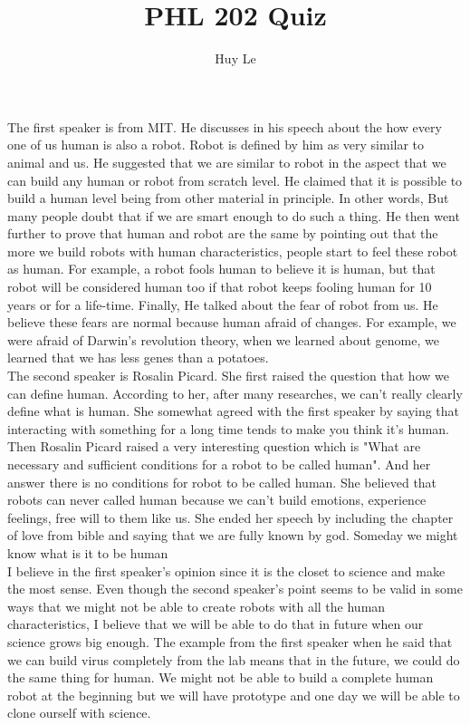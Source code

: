\documentclass{article}
\begin{document}
\author{Huy Le}
\title{ PHL 202 Quiz}
\maketitle
\doublespacing
\indent The first speaker is from MIT. He discusses in his speech about the how every one of us human is also a robot. Robot is defined by him as very similar to animal and us. He suggested that we are similar to robot in the aspect that we can build any human or robot from scratch level. He claimed that it is possible to build a human level being from other material in principle. In other words,  But many people doubt that if we are smart enough to do such a thing. He then went further to prove that human and robot are the same by pointing out that the more we build robots with human characteristics, people start to feel these robot as human. For example, a robot fools human to believe it is human, but that robot will be considered human too if that robot keeps fooling human for 10 years or for a life-time. Finally, He talked about the fear of robot from us. He believe these fears are normal because human afraid of changes. For example, we were afraid of Darwin's revolution theory, when we learned about genome, we learned that we has less genes than a potatoes.\\

\indent The second speaker is Rosalin Picard. She first raised the question that how we can define human. According to her, after many researches, we can't really clearly define what is human. She somewhat agreed with the first speaker by saying that interacting with something for a long time tends to make you think it's human. Then Rosalin Picard raised a very interesting question which is "What are necessary and sufficient conditions for a robot to be called human". And her answer there is no conditions for robot to be called human. She believed that robots can never called human because we can't build emotions, experience feelings, free will to them like us. She ended her speech by including the chapter of love from bible and saying that we are fully known by god. Someday we might know what is it to be human\\

\indent I believe in the first speaker's opinion since it is the closet to science and make the most sense. Even though the second speaker's point seems to be valid in some ways that we might not be able to create robots with all the human characteristics, I believe that we will be able to do that in future when our science grows big enough. The example from the first speaker when he said that we can build virus completely from the lab means that in the future, we could do the same thing for human. We might not be able to build a complete human robot at the beginning but we will have prototype and one day we will be able to clone ourself with science.\\
\end{document}
